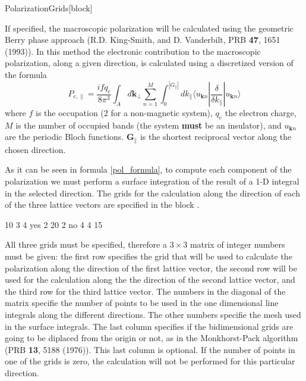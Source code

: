 \begin{fdfentry}{PolarizationGrids}[block]

    If specified, the macroscopic polarization will be calculated using
    the geometric Berry phase approach (R.D. King-Smith, and
    D. Vanderbilt, PRB \textbf{47}, 1651 (1993)). In this method the
    electronic contribution to the macroscopic polarization, along a
    given direction, is calculated using a discretized version of the
    formula
    \begin{equation}
      \label{pol_formula}
      P_{e,\parallel}=\frac{ifq_e}{8\pi^3} \int_A d\mathbf{k}_\perp
      \sum_{n=1}^M \int_0^{|G_\parallel|} dk_{\parallel}
      \langle u_{\mathbf{k} n} |\frac\delta{\delta k_{\parallel}} |
      u_{\mathbf{k} n} \rangle
    \end{equation}
    where $f$ is the occupation (2 for a non-magnetic system), $q_e$ the
    electron charge, $M$ is the number of occupied bands (the system
    \textbf{must} be an insulator), and $u_{\mathbf{k} n}$ are the
    periodic Bloch functions. $\mathbf{G}_\parallel$ is the shortest
    reciprocal vector along the chosen direction.

    As it can be seen in formula \eqref{pol_formula}, to compute each
    component of the polarization we must perform a surface integration
    of the result of a 1-D integral in the selected direction.  The
    grids for the calculation along the direction of each of the three
    lattice vectors are specified in the block .
    \begin{fdfexample}
          10   3  4      yes
           2  20  2       no
           4   4 15
    \end{fdfexample}

    All three grids must be specified, therefore a $3\times3$ matrix of
    integer numbers must be given: the first row specifies the grid that
    will be used to calculate the polarization along the direction of
    the first lattice vector, the second row will be used for the
    calculation along the the direction of the second lattice vector,
    and the third row for the third lattice vector.  The numbers in the
    diagonal of the matrix specifie the number of points to be used in
    the one dimensional line integrals along the different
    directions. The other numbers specifie the mesh used in the surface
    integrals.  The last column specifies if the bidimensional grids are
    going to be diplaced from the origin or not, as in the
    Monkhorst-Pack algorithm (PRB \textbf{13}, 5188 (1976)).  This last
    column is optional.  If the number of points in one of the grids is
    zero, the calculation will not be performed for this particular
    direction.


\end{fdfentry}
